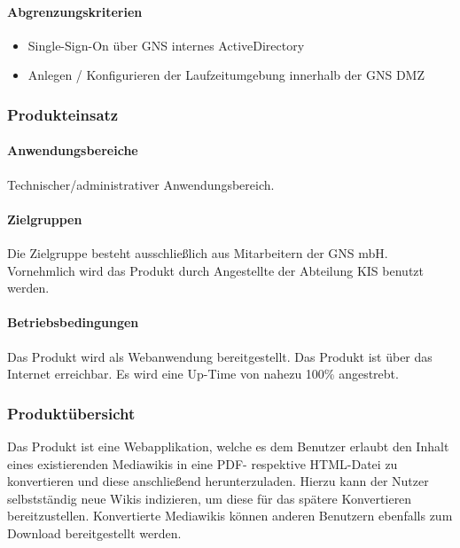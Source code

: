 	\paragraph*{Abgrenzungskriterien}
		\begin{itemize}
			\item Single-Sign-On über GNS internes ActiveDirectory
			\item Anlegen / Konfigurieren der Laufzeitumgebung innerhalb der GNS DMZ
		\end{itemize}

\subsubsection*{Produkteinsatz}

	\paragraph*{Anwendungsbereiche}
		Technischer/administrativer Anwendungsbereich.

	\paragraph*{Zielgruppen}
		Die Zielgruppe besteht ausschließlich aus Mitarbeitern der GNS mbH.
		Vornehmlich wird das Produkt durch Angestellte der Abteilung KIS benutzt werden.

	\paragraph*{Betriebsbedingungen}
		Das Produkt wird als Webanwendung bereitgestellt. Das Produkt ist über das Internet erreichbar.
		Es wird eine Up-Time von nahezu 100\% angestrebt.


\subsubsection*{Produktübersicht}
	Das Produkt ist eine Webapplikation, welche es dem Benutzer erlaubt den Inhalt eines existierenden
	Mediawikis in eine PDF- respektive HTML-Datei zu konvertieren und diese anschließend herunterzuladen.
	Hierzu kann der Nutzer selbstständig neue Wikis indizieren, um diese für das spätere Konvertieren
	bereitzustellen. Konvertierte Mediawikis können anderen Benutzern ebenfalls zum Download bereitgestellt
	werden.